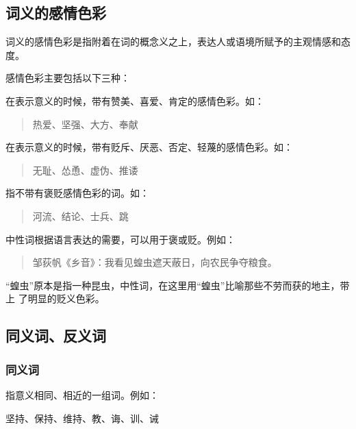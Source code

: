 \documentclass[final,oneside]{ctexbook}
\newenvironment{equotation}{\begin{quotation}\kaishu}{\end{quotation}}
\begin{document}
\subsection{词义的感情色彩}

词义的感情色彩是指附着在词的概念义之上，表达人或语境所赋予的主观情感和态度。

感情色彩主要包括以下三种：

\begin{description}
  \item[褒义词]在表示意义的时候，带有赞美、喜爱、肯定的感情色彩。如：
    \begin{equotation}
      热爱、坚强、大方、奉献
    \end{equotation}

  \item[贬义词]在表示意义的时候，带有贬斥、厌恶、否定、轻蔑的感情色彩。如：
    \begin{equotation}
      无耻、怂恿、虚伪、推诿
    \end{equotation}

  \item[中性词]指不带有褒贬感情色彩的词。如：
    \begin{equotation}
      河流、结论、士兵、跳
    \end{equotation}

    中性词根据语言表达的需要，可以用于褒或贬。例如：
    \begin{equotation}
      邹荻帆《乡音》：我看见蝗虫遮天蔽日，向农民争夺粮食。
    \end{equotation}
    “蝗虫”原本是指一种昆虫，中性词，在这里用“蝗虫”比喻那些不劳而获的地主，带上
    了明显的贬义色彩。

\end{description}

\subsection{同义词、反义词}

\subsubsection{同义词}

指意义相同、相近的一组词。例如：

坚持、保持、维持、教、诲、训、诫
\end{document}
